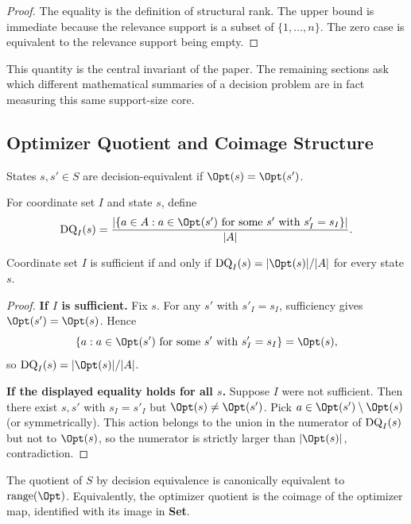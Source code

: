\begin{proof}
The equality is the definition of structural rank. The upper bound is immediate because the relevance support is a subset of $\{1,\dots,n\}$. The zero case is equivalent to the relevance support being empty.
\end{proof}

This quantity is the central invariant of the paper. The remaining sections ask which different mathematical summaries of a decision problem are in fact measuring this same support-size core.

\subsection{Optimizer Quotient and Coimage Structure}

\begin{definition}\label{def:decision-equiv}
States $s,s' \in S$ are decision-equivalent if $\Opt(s)=\Opt(s')$.
\end{definition}

\begin{definition}\label{def:decision-quotient}
For coordinate set $I$ and state $s$, define
\[
\DQ_I(s) =
\frac{|\{a \in A : a \in \Opt(s') \text{ for some } s' \text{ with } s'_I=s_I\}|}{|A|}.
\]
\end{definition}

\begin{proposition}\label{prop:sufficiency-char}
Coordinate set $I$ is sufficient if and only if $\DQ_I(s)=|\Opt(s)|/|A|$ for every state $s$.
\end{proposition}

\begin{proof}
\textbf{If $I$ is sufficient.} Fix $s$. For any $s'$ with $s'_I=s_I$, sufficiency gives $\Opt(s')=\Opt(s)$. Hence
\[
\{a : a\in \Opt(s') \text{ for some } s' \text{ with } s'_I=s_I\}=\Opt(s),
\]
so $\DQ_I(s)=|\Opt(s)|/|A|$.

\textbf{If the displayed equality holds for all $s$.} Suppose $I$ were not sufficient. Then there exist $s,s'$ with $s_I=s'_I$ but $\Opt(s)\neq\Opt(s')$. Pick $a\in \Opt(s')\setminus \Opt(s)$ (or symmetrically). This action belongs to the union in the numerator of $\mathrm{DQ}_I(s)$ but not to $\Opt(s)$, so the numerator is strictly larger than $|\Opt(s)|$, contradiction.
\end{proof}

\begin{proposition}\label{prop:optimizer-coimage}
The quotient of $S$ by decision equivalence is canonically equivalent to $\operatorname{range}(\Opt)$. Equivalently, the optimizer quotient is the coimage of the optimizer map, identified with its image in \textbf{Set}.
\end{proposition}

